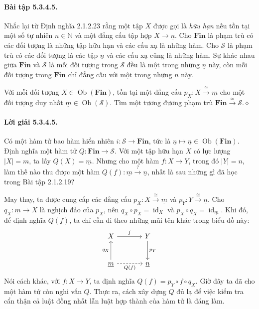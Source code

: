 \paragraph{Bài tập 5.3.4.5.} Nhắc lại từ Định nghĩa 2.1.2.23 rằng một tập $X$ được gọi là \emph{hữu hạn} nếu tồn tại một số tự nhiên $n\in\mathbb N$ và một đẳng cấu tập hợp $X\to\underline{n}$. Cho $\mathbf{Fin}$ là phạm trù có các đối tượng là những tập hữu hạn và các cấu xạ là những hàm. Cho $\mathcal S$ là phạm trù có các đối tượng là các tập $\underline{n}$ và các cấu xạ cũng là những hàm. Sự khác nhau giữa $\mathbf{Fin}$ và $\mathcal S$ là mỗi đối tượng trong $\mathcal S$ đều là một trong những $\underline{n}$ này, còn mỗi đối tượng trong $\mathbf{Fin}$ chỉ đẳng cấu với một trong những $\underline{n}$ này.

Với mỗi đối tượng $X\in\operatorname{Ob}(\mathbf{Fin})$, tồn tại một đẳng cấu $p_X:X\xrightarrow{\cong}\underline{m}$ cho một đối tượng duy nhất $\underline{m}\in\operatorname{Ob}(\mathcal S)$. Tìm một tương đương phạm trù $\mathbf{Fin}\xrightarrow{\simeq}\mathcal S$.\hfill$\diamond$
\paragraph{Lời giải 5.3.4.5.} Có một hàm tử bao hàm hiển nhiên $i:\mathcal S\to\mathbf{Fin}$, tức là $\underline{n}\mapsto\underline{n}\in\operatorname{Ob}(\mathbf{Fin})$. Định nghĩa một hàm tử $Q:\mathbf{Fin}\to\mathcal S$. Với một tập hữu hạn $X$ có lực lượng $|X|=m$, ta lấy $Q(X)=\underline{m}$. Nhưng cho một hàm $f:X\to Y$, trong đó $|Y|=n$, làm thế nào thu được một hàm $Q(f):\underline{m}\xrightarrow{?}\underline{n}$, nhất là sau những gì đã học trong Bài tập 2.1.2.19?

May thay, ta được cung cấp các đẳng cấu $p_X:X\xrightarrow{\cong}\underline{m}$ và $p_Y:Y\xrightarrow{\cong}\underline{n}$. Cho $q_X:\underline{m}\to X$ là nghịch đảo của $p_X$, nên $q_X\circ p_X=\operatorname{id}_X$ và $p_X\circ q_X=\operatorname{id}_{\underline{m}}$. Khi đó, để định nghĩa $Q(f)$, ta
chỉ cần đi theo những mũi tên khác trong biểu đồ này:
\[\begin{tikzcd}[column sep=large,row sep=large]X\arrow[r,"f"]&Y\arrow[d,"p_Y"]\\\underline{m}\arrow[u,"q_X"]\arrow[r,dashed,"Q(f)"']&\underline{n}\end{tikzcd}\]
Nói cách khác, với $f:X\to Y$, ta định nghĩa $Q(f)=p_Y\circ f\circ q_X$. Giờ đây ta đã cho một hàm tử còn nghi vấn $Q$. Thực ra, cách xây dựng $Q$ đủ lạ để việc kiểm tra cẩn thận cả luật đồng nhất lẫn luật hợp thành của hàm tử là đáng làm.

